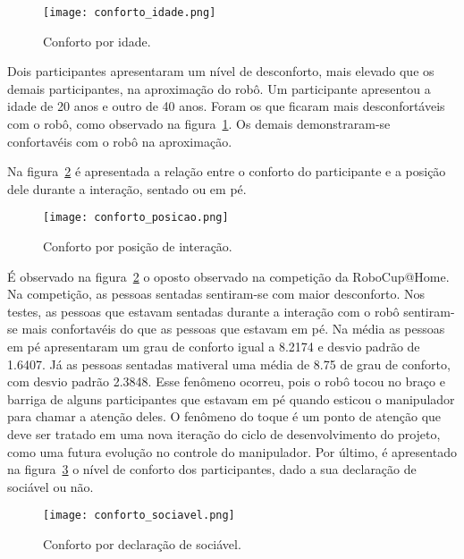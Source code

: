 \begin{figure}[ht!]
	\centering
	\begin{minipage}{0.65\textwidth}
		\caption{Conforto por idade.}
		\texttt{[image: conforto\_idade.png]}
		\label{fig:confortoidade}
	\end{minipage}
\end{figure}

Dois participantes apresentaram um nível de desconforto, mais elevado que os demais participantes, na aproximação do robô. Um participante apresentou a idade de 20 anos e outro de 40 anos. Foram os que ficaram mais desconfortáveis com o robô, como observado na figura~\ref{fig:confortoidade}. Os demais demonstraram-se confortavéis com o robô na aproximação.

Na figura~\ref{fig:confortoposicao} é apresentada a relação entre o conforto do participante e a posição dele durante a interação, sentado ou em pé.

\begin{figure}[ht!]
	\centering
	\begin{minipage}{0.65\textwidth}
		\caption{Conforto por posição de interação.}
		\texttt{[image: conforto\_posicao.png]}
		\label{fig:confortoposicao}
	\end{minipage}
\end{figure}

É observado na figura~\ref{fig:confortoposicao} o oposto observado na competição da RoboCup@Home. Na competição, as pessoas sentadas sentiram-se com maior desconforto. Nos testes, as pessoas que estavam sentadas durante a interação com o robô sentiram-se mais confortavéis do que as pessoas que estavam em pé. Na média as pessoas em pé apresentaram um grau de conforto igual a 8.2174 e desvio padrão de 1.6407. Já as pessoas sentadas mativeral uma média de 8.75 de grau de conforto, com desvio padrão 2.3848. Esse fenômeno ocorreu, pois o robô tocou no braço e barriga de alguns participantes que estavam em pé quando esticou o manipulador para chamar a atenção deles. O fenômeno do toque é um ponto de atenção que deve ser tratado em uma nova iteração do ciclo de desenvolvimento do projeto, como uma futura evolução no controle do manipulador. Por último, é apresentado na figura~\ref{fig:confortosociavel} o nível de conforto dos participantes, dado a sua declaração de sociável ou não.

\begin{figure}[ht!]
	\centering
	\begin{minipage}{0.65\textwidth}
		\caption{Conforto por declaração de sociável.}
		\texttt{[image: conforto\_sociavel.png]}
		\label{fig:confortosociavel}
	\end{minipage}
\end{figure}

